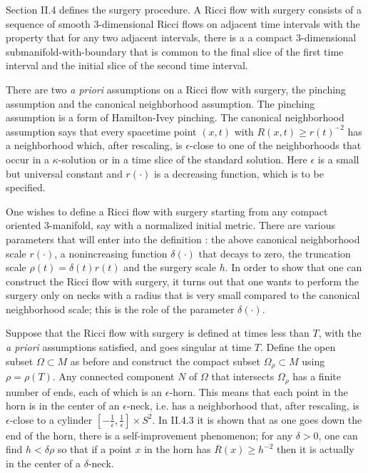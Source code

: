 Section II.4 defines the surgery procedure.
A Ricci flow with surgery consists of a sequence of smooth $3$-dimensional Ricci flows on
adjacent time intervals with the property that for any two adjacent intervals, there is a
a compact $3$-dimensional submanifold-with-boundary that is common to the
final slice of the first time interval and the initial slice of the second time interval.

There are two {\it a priori} assumptions on a Ricci flow with surgery, the
pinching assumption and the
canonical neighborhood assumption.
The pinching assumption is a form of Hamilton-Ivey pinching. The canonical
neighborhood assumption says that every spacetime
point $(x,t)$ with $R(x,t) \ge r(t)^{-2}$ has a neighborhood which,
after rescaling, is $\epsilon$-close to one of the neighborhoods that occur
in a $\kappa$-solution or in a time slice of the standard solution. Here
$\epsilon$ is a small but universal constant and $r(\cdot)$ is a decreasing
function, which is to be specified.

One wishes to define a Ricci flow with
surgery starting from any compact oriented $3$-manifold, say with a
normalized initial metric.  There are
various parameters that will enter into the definition : the above canonical neighborhood scale
$r(\cdot)$,
a nonincreasing function $\delta(\cdot)$ that decays to zero, the truncation
scale $\rho(t) = \delta(t) r(t)$ and the surgery scale $h$. In order
to show that one can construct the Ricci flow with surgery, it turns out that one wants to perform
the surgery only on necks with a radius that is very small compared to the
canonical neighborhood scale; this is the role of the parameter $\delta(\cdot)$.

Suppose that the Ricci flow with surgery is defined at times less than $T$, with
the {\it a priori} assumptions satisfied, and goes
singular at time $T$. Define the open subset $\Omega \subset M$ as before and
construct the compact subset $\Omega_\rho \subset M$
using $\rho = \rho(T)$. Any connected component $N$ of $\Omega$ that
intersects $\Omega_\rho$ has a finite number of ends, each of which is an
$\epsilon$-horn.  This means that each point in the horn is in the center of
an $\epsilon$-neck, i.e. has a neighborhood
that, after rescaling, is $\epsilon$-close to a cylinder $\left[ - \frac{1}{\epsilon},
\frac{1}{\epsilon} \right] \times S^2$. In II.4.3 it is shown that as one goes down the
end of the horn, there is a self-improvement phenomenon; for any
$\delta > 0$, one can find $h < \delta \rho$ so that if a point $x$ in the horn has
$\overline{R}(x) \ge h^{-2}$ then it is actually in the center of a $\delta$-neck.

